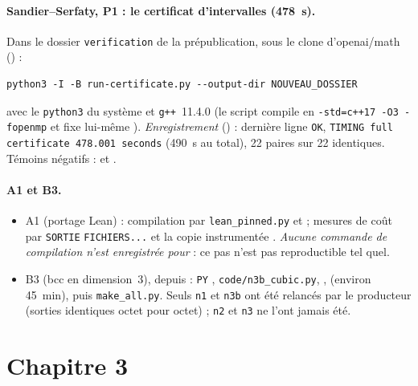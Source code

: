\paragraph{Sandier--Serfaty, P1 : le certificat d'intervalles (478~s).} Dans le dossier \texttt{verification} de la
prépublication, sous le clone d'openai/math
() :
\begin{lstlisting}[style=appC,language={}]
python3 -I -B run-certificate.py --output-dir NOUVEAU_DOSSIER
\end{lstlisting}
avec le \texttt{python3} du système et \texttt{g++}~11.4.0 (le script compile en \texttt{-std=c++17 -O3 -fopenmp} et
fixe lui-même ). \emph{Enregistrement} () :
dernière ligne \texttt{OK}, \texttt{TIMING full certificate 478.001 seconds} (490~s au total), 22 paires sur 22
identiques. Témoins négatifs :  et .

\paragraph{A1 et B3.}
\begin{itemize}
\item A1 (portage Lean) : compilation par \texttt{lean\_pinned.py} et  ;
mesures de coût par  \texttt{SORTIE} \texttt{FICHIERS...} et la copie instrumentée
. \emph{Aucune commande de compilation n'est enregistrée pour
} : ce pas n'est pas reproductible tel quel.
\item B3 (bcc en dimension~3), depuis  : \texttt{PY} ,
\texttt{code/n3b\_cubic.py}, ,  (environ 45~min), puis
\texttt{make\_all.py}. Seuls \texttt{n1} et \texttt{n3b} ont été relancés par le producteur (sorties identiques
octet pour octet) ; \texttt{n2} et \texttt{n3} ne l'ont jamais été.
\end{itemize}

\section{Chapitre 3}\label{appE:sec:ch3}

